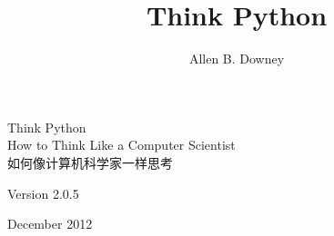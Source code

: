 \documentclass[10pt]{book}
\title{Think Python}
\author{Allen B. Downey}
\newcommand{\theversion}{2.0.5}
\newcommand{\thedate}{December 2012}
\newif\ifplastex
\begin{document}
\ifxetex
\else
\begin{CJK}{UTF8}{gbsn}
\fi


\frontmatter

\ifplastex
    \usepackage{localdef}
    \maketitle

\newcount\anchorcnt
\newcommand*{\Anchor}[1]{%
  \@bsphack%
    \Hy@GlobalStepCount\anchorcnt%
    \edef\@currentHref{anchor.\the\anchorcnt}%
    \Hy@raisedlink{\hyper@anchorstart{\@currentHref}\hyper@anchorend}%
    \M@gettitle{}\label{#1}%
    \@esphack%
}


\else

\newtheorem{exercise}{Exercise}[chapter]




\begin{latexonly}

\renewcommand{\blankpage}{\thispagestyle{empty} \quad \newpage}



\thispagestyle{empty}

\begin{flushright}
\vspace*{2.0in}

\begin{spacing}{3}
{\huge Think Python}\\
{\Large How to Think Like a Computer Scientist \\
如何像计算机科学家一样思考}
\end{spacing}

\vspace{0.25in}

Version \theversion

\thedate

\vfill

\end{flushright}


\blankpage
\blankpage


\end{latexonly}
\end{CJK}
\end{document}
